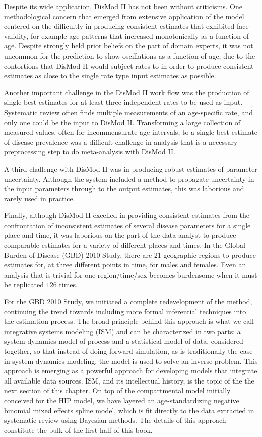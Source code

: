 Despite its wide application, DisMod II has not been without
criticisms.  One methodological concern that emerged from extensive
application of the model centered on the difficultly in producing
consistent estimates that exhibited face validity, for example age
patterns that increased monotonically as a function of age. Despite
strongly held prior beliefs on the part of domain experts, it was not
uncommon for the prediction to show oscillations as a function of age, due
to the contortions that DisMod II would subject rates to in order to
produce consistent estimates as close to the single rate type input
estimates as possible.

Another important challenge in the DisMod II work flow was the
production of single best estimates for at least three independent
rates to be used as input.  Systematic review often finds multiple
measurements of an age-specific rate, and only one could be the input to
DisMod II.  Transforming a large collection of measured values, often
for incommensurate age intervals, to a single best estimate of disease
prevalence was a difficult challenge in analysis that is a necessary
preprocessing step to do meta-analysis with DisMod II.

A third challenge with DisMod II was in producing robust estimates of
parameter uncertainty.  Although the system included a method to
propagate uncertainty in the input parameters through to the output
estimates, this was laborious and rarely used in practice.

Finally, although DisMod II excelled in providing consistent estimates
from the confrontation of inconsistent estimates of several disease
parameters for a single place and time, it was laborious on the part
of the data analyst to produce comparable estimates for a variety of
different places and times. In the Global Burden of Disease (GBD) 2010
Study, there are 21 geographic regions to produce estimates for, at
three different points in time, for males and females. Even an
analysis that is trivial for one region/time/sex becomes burdensome
when it must be replicated $126$ times.

For the GBD 2010 Study, we initiated a complete redevelopment of the
method, continuing the trend towards including more formal inferential
techniques into the estimation process.  The broad principle behind
this approach is what we call integrative systems modeling (ISM) and
can be characterized in two parts: a system dynamics model of process
and a statistical model of data, considered together, so that instead
of doing forward simulation, as is traditionally the case in system
dynamics modeling, the model is used to solve an inverse problem. This
approach is emerging as a powerful approach for developing models that
integrate all available data sources.  ISM, and its intellectual
history, is the topic of the the next section of this chapter.  On top
of the compartmental model initially conceived for the HIP model, we
have layered an age-standardizing negative binomial mixed effects
spline model, which is fit directly to the data extracted in
systematic review using Bayesian methods.  The details of this
approach constitute the bulk of the first half of this book.

